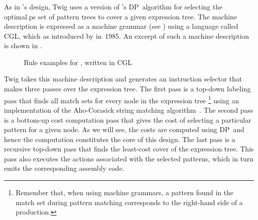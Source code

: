 \subsubsection{}

As in \citeauthor{Ripken:1977}'s design, \gls{Twig} uses a version of
\citeauthor{AhoJohnson:1976}'s \gls{DP}~algorithm for selecting the
\gls{optimal.ps} set of \glspl{pattern tree} to cover a given \gls{expression
  tree}.
%
The \gls{machine description} is expressed as a 
\gls{machine grammar} (see ) using a language
called \gls{CGL}, which as introduced by \textcite{AhoGanapthi:1985} in~1985.
%
An excerpt of such a \gls{machine description} is shown in
.
%
%
\begin{figure}
  \centering%

  \begin{lstpage}{105mm}
  \end{lstpage}

  \caption[Rule examples for ]%
          {%
            Rule examples for , written in
            CGL~\cite{AhoEtAl:1989}%
          }%
\end{figure}
%
\Gls{Twig} takes this \gls{machine description} and generates an
\gls{instruction selector} that makes three passes over the \gls{expression
  tree}.
%
The first pass is a top-down labeling pass that finds all \glspl{match set} for
every \gls{node} in the \gls{expression tree}%
%
\footnote{%
  Remember that, when using \glspl{machine grammar}, a \gls{pattern} found in
  the \gls{match set} during \gls{pattern matching} corresponds to the
  right-hand side of a \gls{production}.%
}
%
using an implementation of the Aho-Corasick string matching
algorithm~\cite{AhoCorasick:1975}.
%
The second pass is a bottom-up cost computation pass that gives the cost of
selecting a particular \gls{pattern} for a given \gls{node}.
%
As we will see, the costs are computed using \gls{DP}~and hence the computation
constitutes the core of this design.
%
The last pass is a recursive top-down pass that finds the least-cost cover of
the \gls{expression tree}.
%
This pass also executes the \glspl{action} associated with the selected
\glspl{pattern}, which in turn emits the corresponding \gls{assembly code}.

